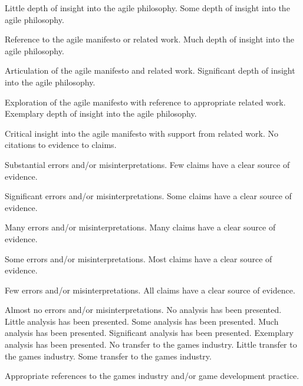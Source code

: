 \documentclass{../fal_assignment}
\begin{document}
\begin{markingrubric}
        \grade 		Little depth of insight into the agile philosophy.
        \grade 		Some depth of insight into the agile philosophy.
        \par 		Reference to the agile manifesto or related work.
        \grade 		Much depth of insight into the agile philosophy.
        \par 		Articulation of the agile manifesto and related work.
        \grade 		Significant depth of insight into the agile philosophy.
        \par 		Exploration of the agile manifesto with reference to appropriate related work.
        \grade 		Exemplary depth of insight into the agile philosophy.
        \par 		Critical insight into the agile manifesto with support from related work.
%
        \grade\fail 	No citations to evidence to claims.
        \par 		Substantial errors and/or misinterpretations.
        \grade 		Few claims have a clear source of evidence.
        \par 		Significant errors and/or misinterpretations.
        \grade 		Some claims have a clear source of evidence.
        \par 		Many errors and/or misinterpretations.
        \grade 		Many claims have a clear source of evidence.
        \par 		Some errors and/or misinterpretations.
        \grade 		Most claims have a clear source of evidence.
        \par 		Few errors and/or misinterpretations.
        \grade 		All claims have a clear source of evidence.
        \par 		Almost no errors and/or misinterpretations.
%
        \grade\fail 	No analysis has been presented.
        \grade 		Little analysis has been presented.
        \grade 		Some analysis has been presented. 
        \grade 		Much analysis has been presented.
        \grade 		Significant analysis has been presented.
        \grade 		Exemplary analysis has been presented.
%
        \grade\fail 	No transfer to the games industry.
        \grade 		Little transfer to the games industry.
        \grade 		Some transfer to the games industry. 
        \par 		Appropriate references to the games industry and/or game development practice. 

\end{markingrubric}
\end{document}
